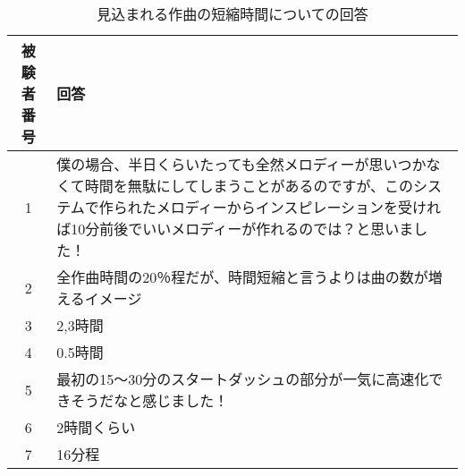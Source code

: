 \begin{table}[htbp]
  \begin{center}
    \caption{見込まれる作曲の短縮時間についての回答}
    \begin{tabular}{cp{30em}}
      \hline
      被験者番号 & 回答\rule[-3mm]{0mm}{8mm} \\ \hline \hline
      1 & 僕の場合、半日くらいたっても全然メロディーが思いつかなくて時間を無駄にしてしまうことがあるのですが、このシステムで作られたメロディーからインスピレーションを受ければ10分前後でいいメロディーが作れるのでは？と思いました！\rule[-3mm]{0mm}{8mm} \\ \hline
      2 & 全作曲時間の20％程だが、時間短縮と言うよりは曲の数が増えるイメージ\rule[-3mm]{0mm}{8mm} \\ \hline
      3 & 2,3時間\rule[-3mm]{0mm}{8mm} \\ \hline
      4 & 0.5時間\rule[-3mm]{0mm}{8mm} \\ \hline
      5 & 最初の15〜30分のスタートダッシュの部分が一気に高速化できそうだなと感じました！\rule[-3mm]{0mm}{8mm} \\ \hline
      6 & 2時間くらい\rule[-3mm]{0mm}{8mm} \\ \hline
      7 & 16分程 \rule[-3mm]{0mm}{8mm} \\ \hline
    \end{tabular}
  \end{center}
\end{table}

